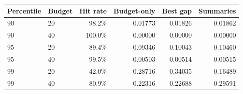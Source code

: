\begin{tabular}{llrrrr}
\toprule
Percentile & Budget & Hit rate & Budget-only & Best gap & Summaries\\
\midrule
90 & 20 & 98.2\% & 0.01773 & 0.01826 & 0.01862\\
90 & 40 & 100.0\% & 0.00000 & 0.00000 & 0.00000\\
95 & 20 & 89.4\% & 0.09346 & 0.10043 & 0.10460\\
95 & 40 & 99.5\% & 0.00503 & 0.00514 & 0.00515\\
99 & 20 & 42.0\% & 0.28716 & 0.34035 & 0.16489\\
99 & 40 & 80.9\% & 0.22316 & 0.22688 & 0.29591\\
\bottomrule
\end{tabular}
